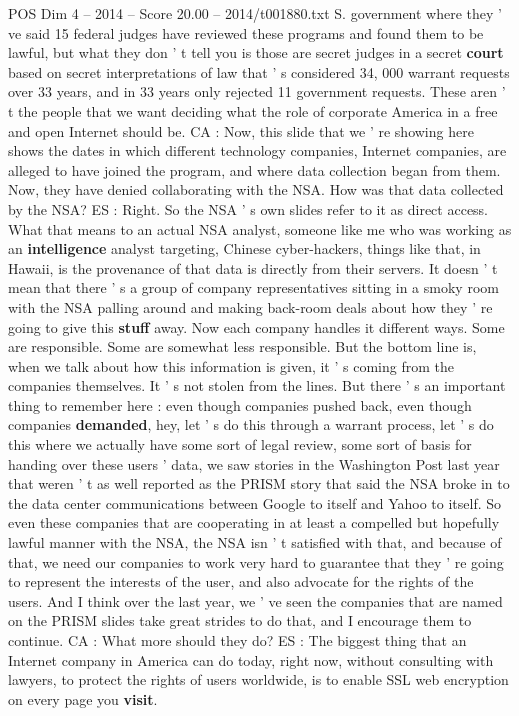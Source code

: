 \begin{textsample}{POS Dim 4 – 2014 – Score 20.00 – 2014/t001880.txt}
S. government where they ' ve said 15 federal judges have reviewed these programs and found them to be lawful, but what they don ' t tell you is those are secret judges in a secret \textbf{court} based on secret interpretations of law that ' s considered 34, 000 warrant requests over 33 years, and in 33 years only rejected 11 government requests.
These aren ' t the people that we want deciding what the role of corporate America in a free and open Internet should be.
CA : Now, this slide that we ' re showing here shows the dates in which different technology companies, Internet companies, are alleged to have joined the program, and where data collection began from them.
Now, they have denied collaborating with the NSA.
How was that data collected by the NSA?
ES : Right.
So the NSA ' s own slides refer to it as direct access.
What that means to an actual NSA analyst, someone like me who was working as an \textbf{intelligence} analyst targeting, Chinese cyber-hackers, things like that, in Hawaii, is the provenance of that data is directly from their servers.
It doesn ' t mean that there ' s a group of company representatives sitting in a smoky room with the NSA palling around and making back-room deals about how they ' re going to give this \textbf{stuff} away.
Now each company handles it different ways.
Some are responsible.
Some are somewhat less responsible.
But the bottom line is, when we talk about how this information is given, it ' s coming from the companies themselves.
It ' s not stolen from the lines.
But there ' s an important thing to remember here : even though companies pushed back, even though companies \textbf{demanded}, hey, let ' s do this through a warrant process, let ' s do this where we actually have some sort of legal review, some sort of basis for handing over these users ' data, we saw stories in the Washington Post last year that weren ' t as well reported as the PRISM story that said the NSA broke in to the data center communications between Google to itself and Yahoo to itself.
So even these companies that are cooperating in at least a compelled but hopefully lawful manner with the NSA, the NSA isn ' t satisfied with that, and because of that, we need our companies to work very hard to guarantee that they ' re going to represent the interests of the user, and also advocate for the rights of the users.
And I think over the last year, we ' ve seen the companies that are named on the PRISM slides take great strides to do that, and I encourage them to continue.
CA : What more should they do?
ES : The biggest thing that an Internet company in America can do today, right now, without consulting with lawyers, to protect the rights of users worldwide, is to enable SSL web encryption on every page you \textbf{visit}.

\end{textsample}
